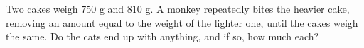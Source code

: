 Two cakes weigh $750$ g and $810$ g. A monkey repeatedly bites the heavier cake, removing an amount equal to the weight of the lighter one, until the cakes weigh the same. Do the cats end up with anything, and if so, how much each?
